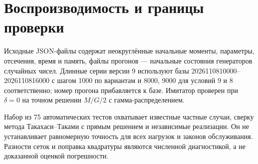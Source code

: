 \documentclass[a4paper,12pt]{article}
\begin{document}
\section{Воспроизводимость и границы проверки}
Исходные JSON-файлы содержат неокруглённые начальные моменты, параметры, отсечения, время и память, файлы прогонов --- начальные состояния генераторов случайных чисел. Длинные серии версии 9 используют базы 2026110810000--2026110816000 с шагом 1000 по вариантам и 8000, 9000 для условий 9 и 8 соответственно; номер прогона прибавляется к базе. Имитатор проверен при \(\delta=0\) на точном решении \(M/G/2\) с гамма-распределением.

Набор из 75 автоматических тестов охватывает известные частные случаи, сверку метода Такахаси--Таками с прямым решением и независимые реализации. Он не устанавливает равномерную точность для всех нагрузок и законов обслуживания. Разности сеток и поправка квадратуры являются численной диагностикой, а не доказанной оценкой погрешности.
\end{document}
